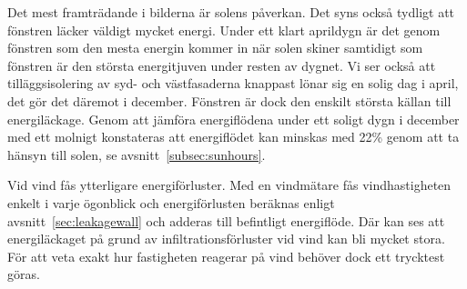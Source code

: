 Det mest framträdande i bilderna är solens påverkan. Det syns också tydligt att fönstren läcker väldigt mycket energi. Under ett klart aprildygn är det genom fönstren som den mesta energin 
kommer in när solen skiner samtidigt som fönstren är den största energitjuven under 
resten av dygnet. Vi ser också att tilläggsisolering av syd-
 och västfasaderna knappast lönar sig en solig dag i april, det gör det däremot i december. Fönstren är dock den enskilt största 
 källan till energiläckage. Genom att jämföra energiflödena under ett soligt dygn i december med ett molnigt konstateras att energiflödet kan minskas med 22\% genom att ta hänsyn till solen, se avsnitt~\ref{subsec:sunhours}.

Vid vind fås ytterligare energiförluster. Med en vindmätare fås vindhastigheten enkelt i varje ögonblick och energiförlusten beräknas enligt avsnitt~\ref{sec:leakagewall} och adderas till befintligt energiflöde. Där kan ses att energiläckaget på grund av infiltrationsförluster vid vind kan bli mycket stora. För att veta exakt hur fastigheten reagerar på vind behöver dock ett trycktest göras.